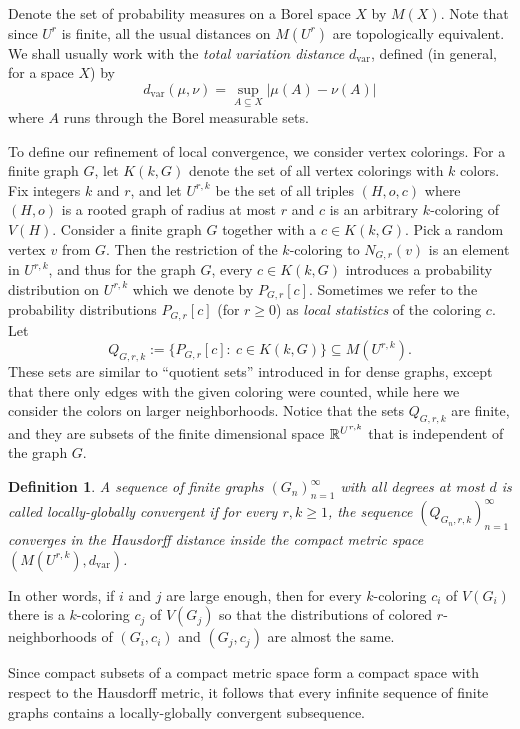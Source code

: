 \documentclass{article}
\newtheorem{definition}[theorem]{Definition}
\newcommand{\dvar}{{d_{\mathrm{var}}}}
\begin{document}
Denote the set of probability measures on a Borel space $X$ by
$M(X)$. Note that since $U^r$ is finite, all the usual distances on
$M(U^r)$ are topologically equivalent. We shall usually work with the
\emph{total variation distance} $\dvar$, defined (in general, for a
space $X$) by
$$
\dvar(\mu,\nu)=\sup_{A\subseteq X}|\mu(A)-\nu(A)|
$$
where $A$ runs through the Borel measurable sets.

To define our refinement of local convergence, we consider vertex
colorings. For a finite graph $G$, let $K(k,G)$ denote the set of all
vertex colorings with $k$ colors. Fix integers $k$ and $r$, and let
$U^{r,k}$ be the set of all triples $(H,o,c)$ where $(H,o)$ is a
rooted graph of radius at most $r$ and $c$ is an arbitrary
$k$-coloring of $V(H)$. Consider a finite graph $G$ together with a
$c \in K(k,G)$. Pick a random vertex $v$ from $G$. Then the
restriction of the $k$-coloring to $N_{G,r}(v)$ is an element in
$U^{r,k}$, and thus for the graph $G$, every $c\in K(k,G)$ introduces
a probability distribution on $U^{r,k}$ which we denote by
$P_{G,r}[c]$. Sometimes we  refer to the probability distributions
$P_{G,r}[c]$ (for $r \ge 0$) as  \emph{local statistics} of the
coloring $c$. Let
$$
Q_{G,r,k} :=\bigl\{P_{G,r}[c]:~ c \in K(k,G)\bigr\} \subseteq
M(U^{r,k}).
$$
These sets are similar to ``quotient sets'' introduced in
\cite{BCLSV2} for dense graphs, except that there only edges with the
given coloring were counted, while here we consider the colors on
larger neighborhoods. Notice that the sets $Q_{G,r,k}$ are finite,
and they are subsets of the finite dimensional space $\mathbb{R}^{U^{r,k}}$
that is independent of the graph $G$.

\begin{definition}
\label{def:local-global} A sequence of finite graphs
$(G_n)_{n=1}^\infty$ with all degrees at most $d$ is called
\emph{locally-globally convergent} if for every $r,k\ge 1$, the
sequence $(Q_{G_n,r,k})_{n=1}^\infty$ converges in the Hausdorff
distance inside the compact metric space $(M(U^{r,k}),\dvar)$.
\end{definition}

{In other words, if $i$ and $j$ are large enough, then for every
$k$-coloring $c_i$ of $V(G_i)$ there is a $k$-coloring $c_j$ of
$V(G_j)$ so that the distributions of colored $r$-neighborhoods of
$(G_i,c_i)$ and $(G_j,c_j)$ are almost the same.}

Since compact subsets of a compact metric space form a compact space
with respect to the Hausdorff metric, it follows that every infinite
sequence of finite graphs contains a locally-globally convergent
subsequence.
\end{document}
